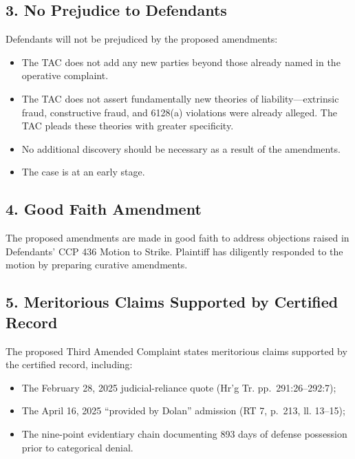\subsection{3. No Prejudice to Defendants}\label{no-prejudice-to-defendants}

Defendants will not be prejudiced by the proposed amendments:

\begin{itemize}
\tightlist
\item
  The TAC does not add any new parties beyond those already named in the operative complaint.
\item
  The TAC does not assert fundamentally new theories of liability---extrinsic fraud, constructive fraud, and \textsection{} 6128(a) violations were already alleged. The TAC pleads these theories with greater specificity.
\item
  No additional discovery should be necessary as a result of the amendments.
\item
  The case is at an early stage.
\end{itemize}

\subsection{4. Good Faith Amendment}\label{good-faith-amendment}

The proposed amendments are made in good faith to address objections raised in Defendants' CCP \textsection{} 436 Motion to Strike. Plaintiff has diligently responded to the motion by preparing curative amendments.

\subsection{5. Meritorious Claims Supported by Certified Record}\label{meritorious-claims-supported-by-certified-record}

The proposed Third Amended Complaint states meritorious claims supported by the certified record, including:

\begin{itemize}
\tightlist
\item
  The February 28, 2025 judicial-reliance quote (Hr'g Tr. pp.~291:26--292:7);
\item
  The April 16, 2025 ``provided by Dolan'' admission (RT 7, p.~213, ll. 13--15);
\item
  The nine-point evidentiary chain documenting 893 days of defense possession prior to categorical denial.
\end{itemize}

